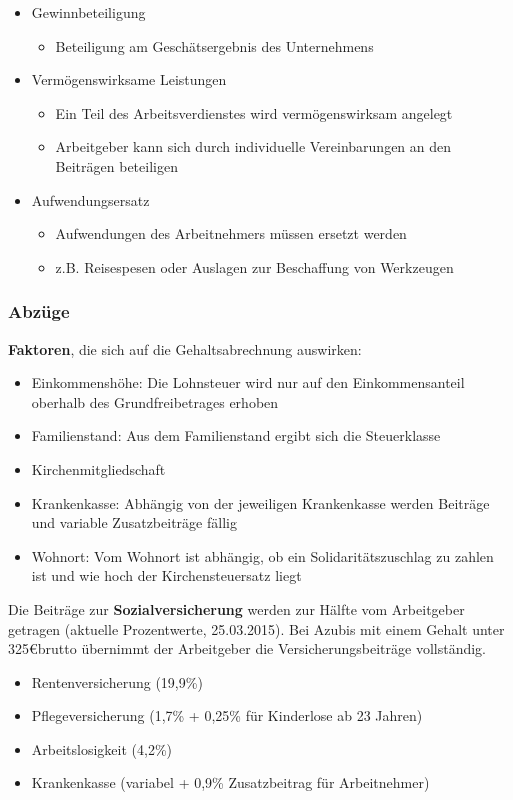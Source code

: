 \begin{itemize}
\begin{itemize}
		\end{itemize}
	\item Gewinnbeteiligung
		\begin{itemize}
			\item Beteiligung am Geschätsergebnis des Unternehmens
		\end{itemize}
	\item Vermögenswirksame Leistungen
		\begin{itemize}
			\item Ein Teil des Arbeitsverdienstes wird vermögenswirksam angelegt
			\item Arbeitgeber kann sich durch individuelle Vereinbarungen an den Beiträgen beteiligen
		\end{itemize}
	\item Aufwendungsersatz
		\begin{itemize}
			\item Aufwendungen des Arbeitnehmers müssen ersetzt werden
			\item z.B. Reisespesen oder Auslagen zur Beschaffung von Werkzeugen
		\end{itemize}
\end{itemize}

\subsubsection{Abzüge}
{\bf Faktoren}, die sich auf die Gehaltsabrechnung auswirken:
\begin{itemize}
\setlength\itemsep{0em}
	\item Einkommenshöhe: Die Lohnsteuer wird nur auf den Einkommensanteil oberhalb des Grundfreibetrages erhoben
	\item Familienstand: Aus dem Familienstand ergibt sich die Steuerklasse
	\item Kirchenmitgliedschaft
	\item Krankenkasse: Abhängig von der jeweiligen Krankenkasse werden Beiträge und variable Zusatzbeiträge fällig
	\item Wohnort: Vom Wohnort ist abhängig, ob ein Solidaritätszuschlag zu zahlen ist und wie hoch der Kirchensteuersatz liegt
\end{itemize}

\noindent Die Beiträge zur {\bf Sozialversicherung} werden zur Hälfte vom Arbeitgeber getragen (aktuelle Prozentwerte, 25.03.2015). Bei Azubis mit einem Gehalt unter 325\euro brutto übernimmt der Arbeitgeber die Versicherungsbeiträge vollständig.
\begin{itemize}
\setlength\itemsep{0em}
	\item Rentenversicherung (19,9\%)
	\item Pflegeversicherung (1,7\% + 0,25\% für Kinderlose ab 23 Jahren)
	\item Arbeitslosigkeit (4,2\%)
	\item Krankenkasse (variabel + 0,9\% Zusatzbeitrag für Arbeitnehmer)
\end{itemize}

